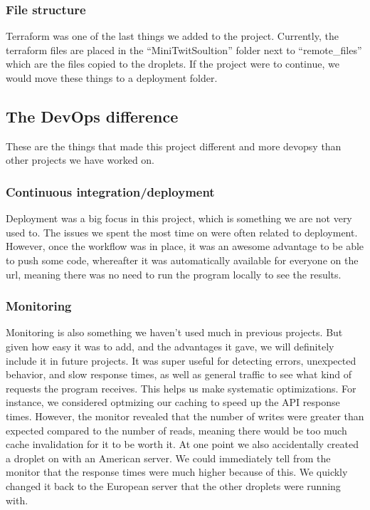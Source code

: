 \subsubsection{File structure}

Terraform was one of the last things we added to the project.
Currently, the terraform files are placed in the ``MiniTwitSoultion'' 
folder next to ``remote\_files'' which are the files copied to the droplets.
If the project were to continue, we would move these things to a deployment folder.

\subsection{The DevOps difference}

These are the things that made this project different and more devopsy
than other projects we have worked on.

\subsubsection{Continuous integration/deployment}

Deployment was a big focus in this project, 
which is something we are not very used to.
The issues we spent the most time on were often related to deployment.
However, once the workflow was in place, it was
an awesome advantage to be able to push some code,
whereafter it was automatically available for everyone on the url, 
meaning there was no need to run the program locally to see the results.

\subsubsection{Monitoring}

Monitoring is also something we haven't used much in previous projects.
But given how easy it was to add, and the advantages it gave,
we will definitely include it in future projects.
It was super useful for detecting errors, unexpected behavior,
and slow response times, as well as general traffic to see 
what kind of requests the program receives.
This helps us make systematic optimizations. For instance,
we considered optmizing our caching to speed up the API response times.
However, the monitor revealed that the number of writes were
greater than expected compared to the number of reads,
meaning there would be too much cache invalidation for it to be worth it.
At one point we also accidentally created a droplet on with an American server.
We could immediately tell from the monitor that the response 
times were much higher because of this.
We quickly changed it back to the European server 
that the other droplets were running with.


